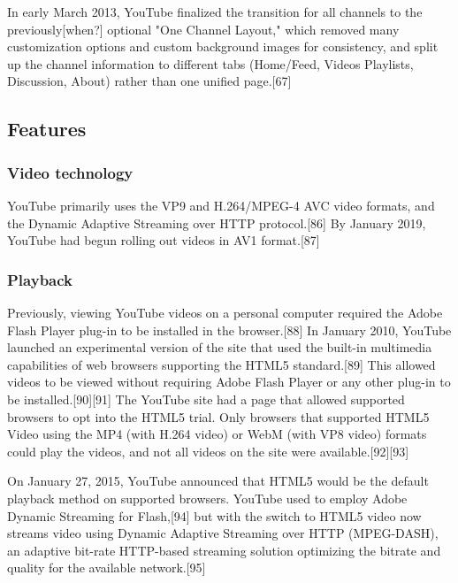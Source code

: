 \documentclass[12pt]{article}
\begin{document}
In early March 2013, YouTube finalized the transition for all channels to the previously[when?] optional "One Channel Layout," which removed many customization options and custom background images for consistency, and split up the channel information to different tabs (Home/Feed, Videos Playlists, Discussion, About) rather than one unified page.[67] 




\subsection{Features}


\subsubsection{Video technology}

YouTube primarily uses the VP9 and H.264/MPEG-4 AVC video formats, and the Dynamic Adaptive Streaming over HTTP protocol.[86] By January 2019, YouTube had begun rolling out videos in AV1 format.[87]





\subsubsection{Playback}

Previously, viewing YouTube videos on a personal computer required the Adobe Flash Player plug-in to be installed in the browser.[88] In January 2010, YouTube launched an experimental version of the site that used the built-in multimedia capabilities of web browsers supporting the HTML5 standard.[89] This allowed videos to be viewed without requiring Adobe Flash Player or any other plug-in to be installed.[90][91] The YouTube site had a page that allowed supported browsers to opt into the HTML5 trial. Only browsers that supported HTML5 Video using the MP4 (with H.264 video) or WebM (with VP8 video) formats could play the videos, and not all videos on the site were available.[92][93]

On January 27, 2015, YouTube announced that HTML5 would be the default playback method on supported browsers. YouTube used to employ Adobe Dynamic Streaming for Flash,[94] but with the switch to HTML5 video now streams video using Dynamic Adaptive Streaming over HTTP (MPEG-DASH), an adaptive bit-rate HTTP-based streaming solution optimizing the bitrate and quality for the available network.[95] 
\end{document}

